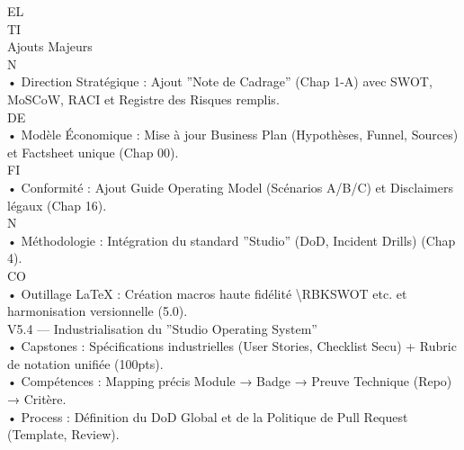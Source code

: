 \vspace{0.5em}
EL\\
TI\\
Ajouts Majeurs\\
\vspace{0.5em}
\vspace{0.5em}
\vspace{0.5em}
\vspace{0.5em}
N\\
• Direction Stratégique : Ajout ”Note de Cadrage” (Chap 1-A) avec SWOT, MoSCoW, RACI et Registre des Risques remplis.\\
\vspace{0.5em}
\vspace{0.5em}
\vspace{0.5em}
\vspace{0.5em}
DE\\
• Modèle Économique : Mise à jour Business Plan (Hypothèses, Funnel, Sources) et Factsheet unique (Chap 00).\\
\vspace{0.5em}
\vspace{0.5em}
\vspace{0.5em}
\vspace{0.5em}
FI\\
• Conformité : Ajout Guide Operating Model (Scénarios A/B/C) et Disclaimers légaux (Chap 16).\\
\vspace{0.5em}
\vspace{0.5em}
\vspace{0.5em}
N\\
• Méthodologie : Intégration du standard ”Studio” (DoD, Incident Drills) (Chap 4).\\
CO\\
• Outillage LaTeX : Création macros haute fidélité \textbackslash{}RBKSWOT etc. et harmonisation versionnelle (5.0).\\
\vspace{0.5em}
\vspace{0.5em}
\vspace{0.5em}
V5.4 — Industrialisation du ”Studio Operating System”\\
• Capstones : Spécifications industrielles (User Stories, Checklist Secu) + Rubric de notation unifiée (100pts).\\
• Compétences : Mapping précis Module → Badge → Preuve Technique (Repo) → Critère.\\
• Process : Définition du DoD Global et de la Politique de Pull Request (Template, Review).\\
